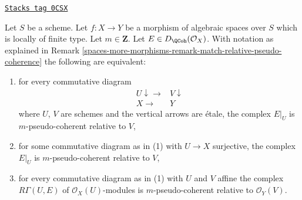 \begin{lemma}
\label{spaces-more-morphisms-lemma-qcoh-relative-pseudo-coherence-characterize}
\href{https://stacks.math.columbia.edu/tag/0CSX}{\texttt{Stacks tag 0CSX}}

Let $S$ be a scheme. Let $f : X \to Y$ be a morphism of algebraic spaces
over $S$ which is locally of finite type. Let $m \in \mathbf{Z}$.
Let $E \in D_\QCoh(\mathcal{O}_X)$. With notation as explained in
Remark \ref{spaces-more-morphisms-remark-match-relative-pseudo-coherence}
the following are equivalent:
\begin{enumerate}
\item for every commutative diagram
$$
\begin{array}{cc}U \downarrow\longrightarrow & V \downarrow \\ X \longrightarrow & Y\end{array}
$$
where $U$, $V$ are schemes and the vertical arrows are \'etale, the complex
$E|_U$ is $m$-pseudo-coherent relative to $V$,
\item for some commutative diagram as in (1) with $U \to X$
surjective, the complex $E|_U$ is $m$-pseudo-coherent relative to $V$,
\item for every commutative diagram as in (1) with $U$ and $V$
affine the complex $R\Gamma(U, E)$ of $\mathcal{O}_X(U)$-modules
is $m$-pseudo-coherent relative to $\mathcal{O}_Y(V)$.
\end{enumerate}
\end{lemma}

